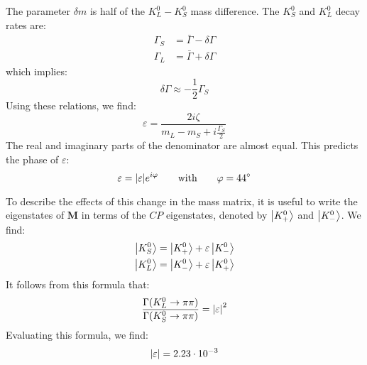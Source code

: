 \documentclass[../../main/main.tex]{subfiles}
\begin{document}
The parameter \( \delta m \) is half of the \( K^0_L - K^0_S \) mass difference. The \( K^0_S \) and \( K^0_L \) decay rates are:
\begin{align}
	\Gamma_S &= \bar{\Gamma} - \delta \Gamma \\
	\Gamma_L &= \bar{\Gamma} + \delta \Gamma
\end{align}
which implies:
\begin{equation}
	\delta \Gamma
	\approx
	- \frac{1}{2} \Gamma_S
	\label{eq:}
\end{equation}
Using these relations, we find:
\begin{equation}
	\varepsilon
	=
	\frac{2i\zeta}{m_L - m_S + i \frac{\Gamma_S}{2}}
	\label{eq:}
\end{equation}
The real and imaginary parts of the denominator are almost equal. This predicts the phase of \( \varepsilon \):
\begin{equation}
	\varepsilon
	=
	\abs{\varepsilon} e^{i \varphi}
	\qquad
	\text{with}
	\qquad
	\varphi = 44^{\circ}
	\label{eq:}
\end{equation}

To describe the effects of this change in the mass matrix, it is useful to write the eigenstates of \( \mathbf{M} \) in terms of the \( CP \) eigenstates, denoted by \( \ket{K^0_+}  \) and \( \ket{K^0_-} \). We find:
\begin{align}
	\ket{K^0_S} &= \ket{K^0_+} + \varepsilon \ket{K^0_-} \\
	\ket{K^0_L} &= \ket{K^0_-} + \varepsilon \ket{K^0_+}
\end{align}
It follows from this formula that:
\begin{equation}
	\frac{\Gamma(K^0_L \rightarrow \pi\pi)}{\Gamma(K^0_S \rightarrow \pi\pi)}
	=
	\abs{\varepsilon}^2
	\label{eq:}
\end{equation}
Evaluating this formula, we find:
\begin{equation}
	\abs{\varepsilon}
	=
	2.23 \cdot 10^{-3}
	\label{eq:}
\end{equation}
\end{document}
